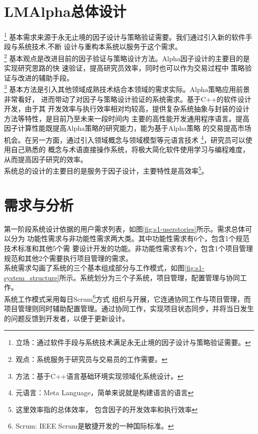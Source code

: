 \section{LMAlpha总体设计}

\footnote{立场：通过软件手段与系统技术满足永无止境的因子设计与策略验证需要。}
基本需求来源于永无止境的因子设计与策略验证需要。我们通过引入新的软件手段与系统技术,不断
设计与重构本系统以服务于这个需求。\\

\footnote{观点：系统服务于研究员与交易员的工作需要。}
基本观点是改进目前的因子验证与策略设计方法。Alpha因子设计的主要目的是实现研究思路的快
速验证，提高研究员效率，同时也可以作为交易过程中
策略验证与改进的辅助手段。\\

\footnote{方法：基于C++语言基础环境实现领域化系统设计。}
基本方法是引入其他领域成熟技术结合本领域的需求实际。Alpha策略应用前景非常看好，
进而带动了对因子与策略设计验证的系统需求。基于C++的软件设计开发，由于其
开发效率与执行效率相对均较高，提供复杂系统抽象与封装的设计方法等特性，是目前乃至未来一段时间内
主要的高性能开发通用程序语言。提高因子计算性能既提高Alpha策略的研究能力，能为基于Alpha策略
的交易提高市场机会。在另一方面，通过引入领域概念与领域模型等元语言技术
\footnote{元语言：Meta Language，简单来说就是构建语言的语言}，研究员可以使用自己熟悉的
概念与术语直接操作系统，将极大简化软件使用学习与编程难度，从而提高因子研究的效率。
\\

系统总的设计的主要目的是服务于因子设计，主要特性是高效率\footnote{这里效率指的总体效率，
包含因子的开发效率和执行效率}。\\

\section{需求与分析}

第一阶段系统设计依据的用户需求列表，如图\ref{fig:s1-userstories}所示。需求总体可以分为
功能性需求与非功能性需求两大类。其中功能性需求有6个，包含1个规范技术标准和其他5个需
要设计开发的功能。非功能性需求有3个，包含1个项目管理规范和其他2个需要执行项目管理的需求。\\

系统需求勾画了系统的三个基本组成部分与工作模式，如图\ref{fig:s1-system_structure}所示。系统划分为三个子系统，项目管理，配置管理与协同工作。 \\


系统工作模式采用每日Scrum\footnote{Scrum: IEEE Scrum是敏捷开发的一种国际标准。}方式
组织与开展，它连通协同工作与项目管理，而项目管理则同时辅助配置管理。通过协同工作，实现项目状态同步，并将当日发生的问题反馈到开发者，以便于更新设计。\\



